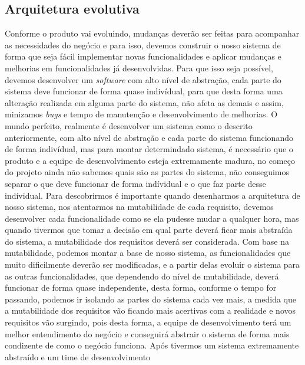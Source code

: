     \subsection{Arquitetura evolutiva}
    Conforme o produto vai evoluindo, mudanças deverão ser feitas para acompanhar
    as necessidades do negócio e para isso, devemos construir o nosso sistema de
    forma que seja fácil implementar novas funcionalidades e aplicar mudanças e
    melhorias em funcionalidades já desenvolvidas. Para que isso seja possível,
    devemos desenvolver um \textit{software} com alto nível de abstração, cada
    parte do sistema deve funcionar de forma quase indivídual, para que desta
    forma uma alteração realizada em alguma parte do sistema, não afeta as demais
    e assim, minizamos \textit{bugs} e tempo de manutenção e desenvolvimento de
    melhorias. \newline
    O mundo perfeito, realmente é desenvolver um sistema como o descrito anteriormente,
    com alto nível de abstração e cada parte do sistema funcionando de forma indivídual,
    mas para montar determindado sistema, é necessário que o produto e a equipe
    de desenvolvimento esteja extremamente madura, no começo do projeto ainda não
    sabemos quais são as partes do sistema, não conseguimos separar o que deve
    funcionar de forma indívidual e o que faz parte desse indívidual. Para
    descobrirmos é importante quando desenharmos a arquitetura de nosso sistema,
    nos atentarmos na mutabilidade de cada requisito, devemos desenvolver cada
    funcionalidade como se ela pudesse mudar a qualquer hora, mas quando tivermos
    que tomar a decisão em qual parte deverá ficar mais abstraída do sistema,
    a mutabilidade dos requisitos deverá ser considerada. Com base na mutabilidade,
    podemos montar a base de nosso sistema, as funcionalidades que muito dificilmente
    deverão ser modificadas, e a partir delas evoluir o sistema para as outras
    funcionalidades, que dependendo do nível de mutabilidade, deverá funcionar de
    forma quase independente, desta forma, conforme o tempo for passando, podemos
    ir isolando as partes do sistema cada vez mais, a medida que a mutabilidade
    dos requisitos vão ficando mais acertivas com a realidade e novos requisitos
    vão surgindo, pois desta forma, a equipe de desenvolvimento terá um melhor
    entendimento do negócio e conseguirá abstrair o sistema de forma mais condizente
    de como o negócio funciona. \newline
    Após tivermos um sistema extremamente abstraído e um time de desenvolvimento
